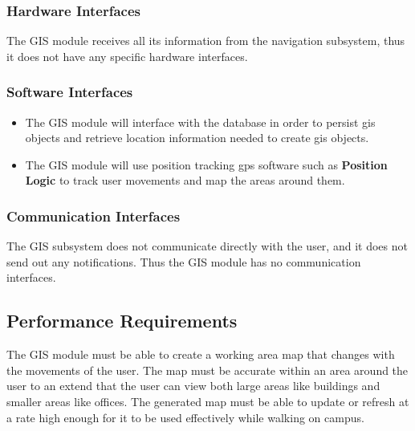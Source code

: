 \subsubsection{Hardware Interfaces}
The GIS module receives all its information from the navigation subsystem, thus it does not have any specific hardware interfaces.
\subsubsection{Software Interfaces}
\begin{itemize}
\item The GIS module will interface with the database in order to persist gis objects and retrieve location information needed to create gis objects.

\item The GIS module will use position tracking gps software such as \textbf{Position Logic} to track user movements and map the areas around them.
\end{itemize}

\subsubsection{Communication Interfaces}
The GIS subsystem does not communicate directly with the user, and it does not send out any notifications. Thus the GIS module has no communication interfaces.

\subsection{Performance Requirements}
The GIS module must be able to create a working area map that changes with the movements of the user. The map must be accurate within an area around the user to an extend that the user can view both large areas like buildings and smaller areas like offices. The generated map must be able to update or refresh at a rate high enough for it to be used effectively while walking on campus.
